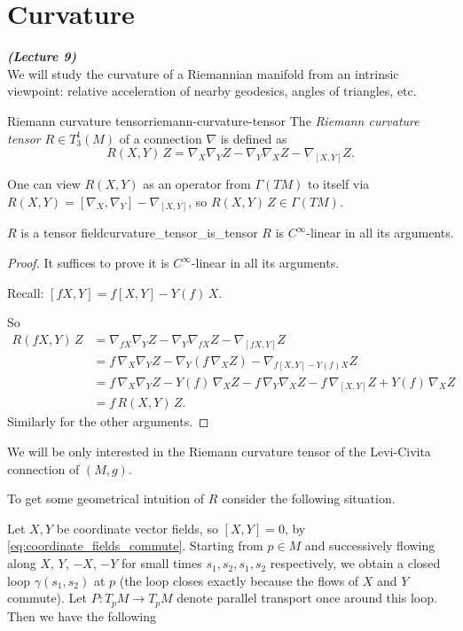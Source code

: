 \section{Curvature}

\vspace{0.4cm}\emph{\textbf{(Lecture 9)}}\\


We will study the curvature of a Riemannian manifold from an intrinsic viewpoint: relative acceleration of nearby geodesics, angles of triangles, etc.

\begin{colordef}{Riemann curvature tensor}{riemann-curvature-tensor}
The \emph{Riemann curvature tensor} $R\in T^1_3(M)$ of a connection $\nabla$ is defined as
\[
R(X,Y)\,Z = \nabla_X \nabla_Y Z - \nabla_Y \nabla_X Z - \nabla_{[X,Y]} Z.
\]
\end{colordef}

One can view $R(X,Y)$ as an operator from $\Gamma(TM)$ to itself via $R(X,Y) = [\nabla_X, \nabla_Y] - \nabla_{[X,Y]}$, so $R(X,Y)\,Z\in \Gamma(TM)$.

\begin{colortheo}{$R$ is a tensor field}{curvature_tensor_is_tensor}
$R$ is $C^\infty$-linear in all its arguments.
\end{colortheo}

\begin{proof}
It suffices to prove it is $C^\infty$-linear in all its arguments.

Recall: $[fX, Y] = f[X,Y] - Y(f)\,X$.

So
\begin{align*}
R(fX, Y)\,Z &= \nabla_{fX} \nabla_Y Z - \nabla_Y \nabla_{fX} Z - \nabla_{[fX,Y]} Z \\
&= f\,\nabla_X \nabla_Y Z - \nabla_Y(f\,\nabla_X Z) - \nabla_{f[X,Y] - Y(f)X} Z \\
&= f\,\nabla_X \nabla_Y Z - Y(f)\,\nabla_X Z - f\,\nabla_Y \nabla_X Z - f\,\nabla_{[X,Y]} Z + Y(f)\,\nabla_X Z \\
&= f\,R(X,Y)\,Z.
\end{align*}
Similarly for the other arguments.
\end{proof}

We will be only interested in the Riemann curvature tensor of the Levi-Civita connection of $(M,g)$.

To get some geometrical intuition of $R$ consider the following situation.


Let $X, Y$ be coordinate vector fields, so $[X,Y] = 0$, by \eqref{eq:coordinate_fields_commute}. Starting from $p \in M$ and successively flowing along $X$, $Y$, $-X$, $-Y$ for small times $s_1, s_2, s_1, s_2$ respectively, we obtain a closed loop $\gamma(s_1, s_2)$ at $p$ (the loop closes exactly because the flows of $X$ and $Y$ commute). Let $P \colon T_pM \to T_pM$ denote parallel transport once around this loop. Then we have the following

